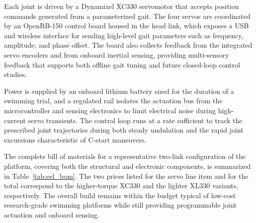 Each joint is driven by a Dynamixel XC330 servomotor that accepts position commands generated from a parameterized gait. The four servos are coordinated by an OpenRB-150 control board housed in the head link, which exposes a USB and wireless interface for sending high-level gait parameters such as frequency, amplitude, and phase offset. The board also collects feedback from the integrated servo encoders and from onboard inertial sensing, providing multi-sensory feedback that supports both offline gait tuning and future closed-loop control studies.

Power is supplied by an onboard lithium battery sized for the duration of a swimming trial, and a regulated rail isolates the actuation bus from the microcontroller and sensing electronics to limit electrical noise during high-current servo transients. The control loop runs at a rate sufficient to track the prescribed joint trajectories during both steady undulation and the rapid joint excursions characteristic of C-start maneuvers.

The complete bill of materials for a representative two-link configuration of the platform, covering both the structural and electronic components, is summarized in Table~\ref{tab:eel_bom}. The two prices listed for the servo line item and for the total correspond to the higher-torque XC330 and the lighter XL330 variants, respectively. The overall build remains within the budget typical of low-cost research-grade swimming platforms while still providing programmable joint actuation and onboard sensing.

